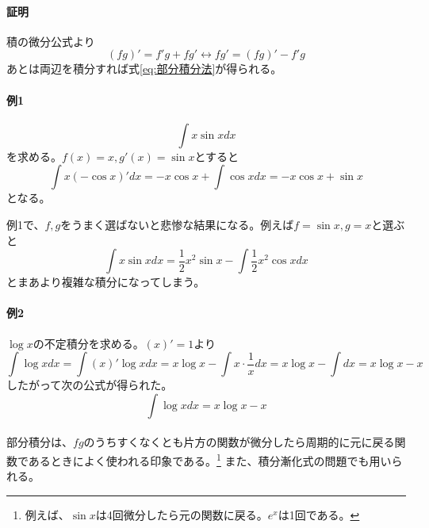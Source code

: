 \documentclass[a4j,dvipdfmx]{jsarticle}
\begin{document}
                \paragraph{証明}積の微分公式より
                \begin{equation}
                    (fg)'=f'g+fg' \leftrightarrow fg' = (fg)'-f'g
                \end{equation}
                あとは両辺を積分すれば式\ref{eq:部分積分法}が得られる。

                \paragraph{例1}
                \begin{equation*}
                    \int x\sin x dx
                \end{equation*}
                を求める。$f(x)=x,g'(x)=\sin x$とすると
                \begin{equation*}
                    \int x(-\cos x)'dx = -x\cos x + \int \cos xdx = -x\cos x+\sin x
                \end{equation*}
                となる。

                例1で、$f,g$をうまく選ばないと悲惨な結果になる。例えば$f=\sin x,g=x$と選ぶと
                \begin{equation*}
                    \int x\sin xdx=\frac{1}{2}x^2\sin x - \int \frac{1}{2}x^2\cos xdx
                \end{equation*}
                とまあより複雑な積分になってしまう。

                \paragraph{例2}$\log x$の不定積分を求める。$(x)'=1$より
                \begin{equation*}
                    \int \log xdx=\int (x)'\log xdx=x\log x - \int x\cdot \frac{1}{x}dx=x\log x-\int dx=x\log x-x
                \end{equation*}
                したがって次の公式が得られた。
                \begin{equation}
                    \int \log xdx=x\log x-x\label{eq:log xの不定積分}
                \end{equation}\\

                部分積分は、$fg$のうちすくなくとも片方の関数が微分したら周期的に元に戻る関数であるときによく使われる印象である。\footnote{例えば、$\sin x$は4回微分したら元の関数に戻る。$e^x$は1回である。}
                また、積分漸化式の問題でも用いられる。
            \clearpage
\end{document}
